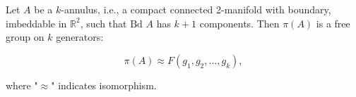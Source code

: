 Let $A$ be a $k$-annulus, i.e., a compact connected 2-manifold with boundary, imbeddable in $\mathbb{R}^2$, such that $\text{Bd } A$ has $k + 1$ components. Then $\pi(A)$ is a free group on $k$ generators:

$$\pi(A) \approx F(g_1, g_2, \ldots, g_k),$$

where "$\approx$" indicates isomorphism.
